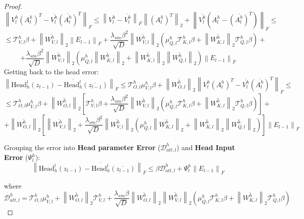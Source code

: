 \documentclass[a4paper,14pt]{extarticle}
\begin{document}
\begin{proof}
        $$\left\|V_l^h (A_l^h)^T - \overline{V_l^h} (\overline{A_l^h})^T\right\|_F \leqslant \left\|V_l^h - \overline{V_l^h}\right\|_F \left\|(A_l^h)^T\right\|_2 + \left\|\overline{V_l^h} (A_l^h - (\overline{A_l^h})^T)\right\|_F\leqslant $$
        $$\leqslant  \mathcal{T}_{V,l}^h \beta + \left\|\overline{W_{V,l}^h}\right\|_2 \left\|E_{l-1}\right\|_F + \frac{\lambda_{sm} \beta^2}{\sqrt{D}} \left\|\overline{W_{V,l}^h}\right\|_2 \left(\mu_{Q,l}^h \mathcal{T}_{K,l}^h \beta + \left\|\overline{W_{K,l}^h}\right\|_2 \mathcal{T}_{Q,l}^h \beta \right) + $$
        $$ + \frac{\lambda_{sm} \beta^2}{\sqrt{D}} \left\|\overline{W_{V,l}^h}\right\|_2 \left(\mu_{Q,l}^h \left\|\overline{W_{K,l}^h}\right\|_2 + \left\|\overline{W_{K,l}^h}\right\|_2 \left\|\overline{W_{Q,l}^h}\right\|_2\right) \left\|E_{l-1}\right\|_F$$
        Getting back to the head error:
        $$\left\|\text{Head}_h^l(z_{l-1}) - \overline{\text{Head}_h^l}(\overline{z_{l-1}})\right\|_F \leqslant \mathcal{T}_{O,l}^h \mu_{V,l}^h \beta + \left\|\overline{W_{O,l}^h}\right\|_2 \left\|V_l^h (A_l^h)^T - \overline{V_l^h} (\overline{A_l^h})^T\right\|_F\leqslant$$
        $$\leqslant\mathcal{T}_{O,l}^h \mu_{V,l}^h \beta + \left\|\overline{W_{O,l}^h}\right\|_2 \left[ \mathcal{T}_{V,l}^h \beta + \frac{\lambda_{sm} \beta^2}{\sqrt{D}} \left\|\overline{W_{V,l}^h}\right\|_2 \left(\mu_{Q,l}^h \mathcal{T}_{K,l}^h \beta + \left\|\overline{W_{K,l}^h}\right\|_2 \mathcal{T}_{Q,l}^h \beta \right) \right] + $$
        $$ + \left\|\overline{W_{O,l}^h}\right\|_2 \left[ \left\|\overline{W_{V,l}^h}\right\|_2 + \frac{\lambda_{sm} \beta^2}{\sqrt{D}} \left\|\overline{W_{V,l}^h}\right\|_2 \left(\mu_{Q,l}^h \left\|\overline{W_{K,l}^h}\right\|_2 + \left\|\overline{W_{K,l}^h}\right\|_2 \left\|\overline{W_{Q,l}^h}\right\|_2\right) \right] \left\|E_{l-1}\right\|_F$$
        
        Grouping the error into \textbf{Head parameter Error} ($\mathcal{D}_{att, l}^h$) and \textbf{Head Input Error} ($\Psi_l^h$):
        $$\left\|\text{Head}_h^l(z_{l-1}) - \overline{\text{Head}_h^l}(\overline{z_{l-1}})\right\|_F \leqslant \beta \mathcal{D}_{att, l}^h + \Psi_l^h \left\|E_{l-1}\right\|_F$$

        where
        $$\mathcal{D}_{att, l}^h = \mathcal{T}_{O,l}^h \mu_{V,l}^h + \left\|\overline{W_{O,l}^h}\right\|_2 \mathcal{T}_{V,l}^h + \frac{\lambda_{sm} \beta}{\sqrt{D}} \left\|\overline{W_{O,l}^h}\right\|_2 \left\|\overline{W_{V,l}^h}\right\|_2 \left(\mu_{Q,l}^h \mathcal{T}_{K,l}^h \beta + \left\|\overline{W_{K,l}^h}\right\|_2 \mathcal{T}_{Q,l}^h \beta \right)$$
        

\end{proof}
\end{document}
